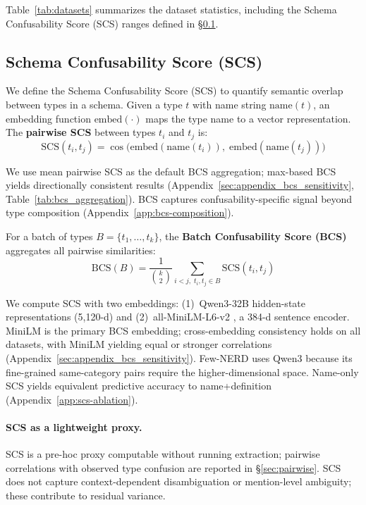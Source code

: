 Table~\ref{tab:datasets} summarizes the dataset statistics, including the Schema Confusability Score (SCS) ranges defined in \S\ref{sec:scs}.


\subsection{Schema Confusability Score (SCS)}
\label{sec:scs}

We define the Schema Confusability Score (SCS) to quantify semantic overlap between types in a schema. Given a type $t$ with name string $\text{name}(t)$, an embedding function $\text{embed}(\cdot)$ maps the type name to a vector representation. The \textbf{pairwise SCS} between types $t_i$ and $t_j$ is:
{\small
\[
\text{SCS}(t_i, t_j) = \cos\bigl(\text{embed}(\text{name}(t_i)),\; \text{embed}(\text{name}(t_j))\bigr)
\]
}

We use mean pairwise SCS as the default BCS aggregation; max-based BCS yields directionally consistent results (Appendix~\ref{sec:appendix_bcs_sensitivity}, Table~\ref{tab:bcs_aggregation}). BCS captures confusability-specific signal beyond type composition (Appendix~\ref{app:bcs-composition}).

For a batch of types $B = \{t_1, \ldots, t_k\}$, the \textbf{Batch Confusability Score (BCS)} aggregates all pairwise similarities:
\[
\text{BCS}(B) = \frac{1}{\binom{k}{2}} \sum_{i < j,\; t_i, t_j \in B} \text{SCS}(t_i, t_j)
\]

We compute SCS with two embeddings: (1)~Qwen3-32B \citep{qwen3-2025} hidden-state representations (5{,}120-d) and (2)~all-MiniLM-L6-v2 \citep{minilm-2020,sentence-bert-2019}, a 384-d sentence encoder. MiniLM is the primary BCS embedding; cross-embedding consistency holds on all datasets, with MiniLM yielding equal or stronger correlations (Appendix~\ref{sec:appendix_bcs_sensitivity}). Few-NERD uses Qwen3 because its fine-grained same-category pairs require the higher-dimensional space. Name-only SCS yields equivalent predictive accuracy to name+definition (Appendix~\ref{app:scs-ablation}).

\paragraph{SCS as a lightweight proxy.}
\label{sec:scs-validation}
SCS is a pre-hoc proxy computable without running extraction; pairwise correlations with observed type confusion are reported in \S\ref{sec:pairwise}. SCS does not capture context-dependent disambiguation or mention-level ambiguity; these contribute to residual variance.

